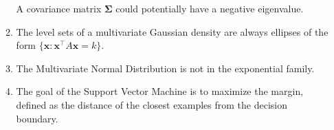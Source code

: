 \documentclass[letter, 12pt]{article}
\begin{document}
\begin{enumerate}
\begin{enumerate}
{      A covariance matrix $\mathbf{\Sigma}$ could potentially have a negative eigenvalue.
      }
    \vspace{.4in}
    \item
      \raisebox{.1in}{\fbox{\parbox[t][.4in]{.4in}{\mbox{\hspace{.4in}}}}} \parbox[t]{5in}{
      The level sets of a multivariate Gaussian density are always ellipses of the form
      $\{\mathbf{x}: \mathbf{x}^\top A \mathbf{x} = k\}$.
      }
    \vspace{.4in}
    \item
      \raisebox{.1in}{\fbox{\parbox[t][.4in]{.4in}{\mbox{\hspace{.4in}}}}} \parbox[t]{5in}{
          The Multivariate Normal Distribution is not in the exponential family.
      }
    \vspace{.4in}
    \item
      \raisebox{.1in}{\fbox{\parbox[t][.4in]{.4in}{\mbox{\hspace{.4in}}}}} \parbox[t]{5in}{
          The goal of the Support Vector Machine is to maximize the margin, defined as the distance
          of the closest examples from the decision boundary.
      }


\end{enumerate}
\end{enumerate}
\end{document}
